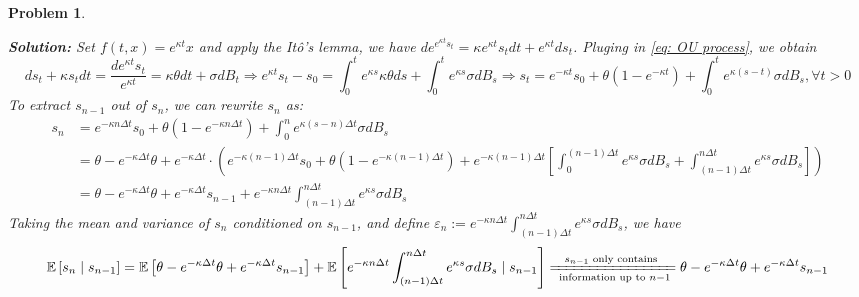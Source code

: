 \documentclass[11pt]{article}
\theoremstyle{plain} %
\newtheorem{problem}[theorem]{Problem}
\newenvironment{solution}
{\color{C2}\normalfont\begin{framed}\begingroup\textbf{Solution:} }
  {\endgroup\end{framed}}
\theoremstyle{remark}
\begin{document}
\begin{problem}
\begin{enumerate}[label=(\alph*)]
        \begin{solution}
          Set $f(t, x) = e^{\kappa t}x$ and apply the It\^{o}'s lemma, we have
          $de^{e^{\kappa t}s_t} = \kappa e^{\kappa t}s_t dt + e^{\kappa t} ds_t$. Pluging in \cref{eq: OU process}, we obtain
          $$
            d s_t + \kappa s_t d t = \frac{d e^{\kappa t}s_t}{e^{\kappa t}} = \kappa \theta dt+\sigma d B_t
            \Longrightarrow
            e^{\kappa t}s_t - s_0 = \int_{0}^t e^{\kappa s}\kappa \theta ds + \int_{0}^t e^{\kappa s}\sigma d B_s
            \Longrightarrow
            s_t = e^{-\kappa t}s_0 + \theta \left(1 - e^{-\kappa t}\right) + \int_{0}^t e^{\kappa(s-t)}\sigma d B_s, \forall t>0
          $$
          To extract $s_{n-1}$ out of $s_n$, we can rewrite $s_n$ as:
          \begin{align*}
            s_n
             & = e^{-\kappa n\Delta t}s_0 + \theta \left(1 - e^{-\kappa n\Delta t}\right) + \int_{0}^n e^{\kappa(s-n)\Delta t}\sigma d B_s                                                                                                                                                                                           \\
             & = \theta - e^{-\kappa\Delta t}\theta + e^{-\kappa\Delta t} \cdot \left(e^{-\kappa (n-1)\Delta t}s_0 + \theta \left(1 - e^{-\kappa (n-1)\Delta t}\right) + e^{-\kappa (n-1)\Delta t} \left[\int_{0}^{(n-1)\Delta t} e^{\kappa s}\sigma d B_s + \int_{(n-1)\Delta t}^{n\Delta t} e^{\kappa s}\sigma d B_s\right]\right) \\
             & = \theta - e^{-\kappa\Delta t}\theta + e^{-\kappa\Delta t} s_{n-1} + e^{-\kappa n\Delta t}\int_{(n-1)\Delta t}^{n\Delta t} e^{\kappa s}\sigma d B_s
          \end{align*}
          Taking the mean and variance of $s_{n}$ conditioned on $s_{n-1}$, and define $\varepsilon_n := e^{-\kappa n\Delta t}\int_{(n-1)\Delta t}^{n\Delta t} e^{\kappa s}\sigma d B_s$, we have
          \begin{align*}
            \mathbb{E}\left[s_n \mid s_{n-1}\right]
             & = \mathbb{E}\left[\theta - e^{-\kappa\Delta t}\theta + e^{-\kappa\Delta t} s_{n-1}\right] + \mathbb{E}\left[e^{-\kappa n\Delta t}\int_{(n-1)\Delta t}^{n\Delta t} e^{\kappa s}\sigma d B_s \mid s_{n-1}\right]
            \xlongequal[\text{ information up to } n-1 ]{ s_{n-1} \text{ only contains }} \theta - e^{-\kappa\Delta t}\theta + e^{-\kappa\Delta t} s_{n-1}                                                                    \\

\end{align*}
\end{solution}
\end{enumerate}
\end{problem}
\end{document}
